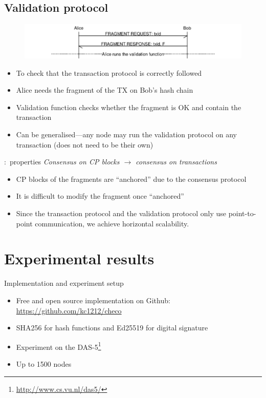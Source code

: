 \documentclass{beamer}
\begin{document}
\subsection{Validation protocol}
\begin{frame}{\subsecname}
  \begin{figure}[h]
  \includegraphics[width=1.0\textwidth]{vd-proto}
  \centering
  \end{figure}
\begin{itemize}
\item To check that the transaction protocol is correctly followed
\item Alice needs the fragment of the TX on Bob's hash chain 
\item Validation function checks whether the fragment is OK and contain the transaction
\item Can be generalised---any node may run the validation protocol on any transaction (does not need to be their own)
\end{itemize}
\end{frame}

\begin{frame}{\subsecname:~properties}
\emph{Consensus on CP blocks $\rightarrow$ consensus on transactions}
\bigskip
\begin{itemize}
  \item CP blocks of the fragments are ``anchored'' due to the consensus protocol
  \item It is difficult to modify the fragment once ``anchored''
  \item Since the transaction protocol and the validation protocol only use point-to-point communication,
  we achieve horizontal scalability.
\end{itemize}
\end{frame}

\section{Experimental results}
\begin{frame}{Implementation and experiment setup}
  \begin{itemize}
    \item Free and open source implementation on Github:
      \url{https://github.com/kc1212/checo}
    \item SHA256 for hash functions and Ed25519 for digital signature
    \item Experiment on the DAS-5\footnote{\url{http://www.cs.vu.nl/das5/}}
    \item Up to 1500 nodes
  \end{itemize}
\end{frame}
\end{document}
